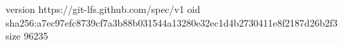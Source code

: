 version https://git-lfs.github.com/spec/v1
oid sha256:a7ec97efc8739cf7a3b88b031544a13280e32ec1d4b2730411e8f2187d26b2f3
size 96235
